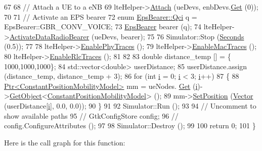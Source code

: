 \begin{DoxyCode}
67 
68   \textcolor{comment}{// Attach a UE to a eNB}
69   lteHelper->\hyperlink{classns3_1_1LteHelper_a9466743f826aa2652a87907b7f0a1c87}{Attach} (ueDevs, enbDevs.\hyperlink{classns3_1_1NetDeviceContainer_a677d62594b5c9d2dea155cc5045f4d0b}{Get} (0));
70 
71   \textcolor{comment}{// Activate an EPS bearer}
72   \textcolor{keyword}{enum} \hyperlink{structns3_1_1EpsBearer_aecf0c67109c5eb4ec0b07226fff5885e}{EpsBearer::Qci} q = EpsBearer::GBR\_CONV\_VOICE;
73   \hyperlink{structns3_1_1EpsBearer}{EpsBearer} bearer (q);
74   lteHelper->\hyperlink{classns3_1_1LteHelper_ac896e16cf162e4beeaa292d39ab1b700}{ActivateDataRadioBearer} (ueDevs, bearer);
75 
76   Simulator::Stop (\hyperlink{group__timecivil_ga33c34b816f8ff6628e33d5c8e9713b9e}{Seconds} (0.5));
77 
78   lteHelper->\hyperlink{classns3_1_1LteHelper_ad6d7edf234d29f7b8363e9ebf73fe32e}{EnablePhyTraces} ();
79   lteHelper->\hyperlink{classns3_1_1LteHelper_affa3a12841520407d3662417fe41863d}{EnableMacTraces} ();
80   lteHelper->\hyperlink{classns3_1_1LteHelper_abadfdd04d30b261e9b6f0846b4784928}{EnableRlcTraces} ();
81 
82 
83   \textcolor{keywordtype}{double} distance\_temp [] = \{ 1000,1000,1000\};
84   std::vector<double> userDistance;
85   userDistance.assign (distance\_temp, distance\_temp + 3);
86   \textcolor{keywordflow}{for} (\textcolor{keywordtype}{int} \hyperlink{bernuolliDistribution_8m_a6f6ccfcf58b31cb6412107d9d5281426}{i} = 0; \hyperlink{bernuolliDistribution_8m_a6f6ccfcf58b31cb6412107d9d5281426}{i} < 3; \hyperlink{bernuolliDistribution_8m_a6f6ccfcf58b31cb6412107d9d5281426}{i}++)
87     \{
88       \hyperlink{classns3_1_1Ptr}{Ptr<ConstantPositionMobilityModel>} mm = ueNodes.
      \hyperlink{classns3_1_1NodeContainer_a9ed96e2ecc22e0f5a3d4842eb9bf90bf}{Get} (\hyperlink{bernuolliDistribution_8m_a6f6ccfcf58b31cb6412107d9d5281426}{i})->\hyperlink{classns3_1_1Object_a13e18c00017096c8381eb651d5bd0783}{GetObject}<\hyperlink{classns3_1_1ConstantPositionMobilityModel}{ConstantPositionMobilityModel}> ();
89       mm->\hyperlink{classns3_1_1MobilityModel_ac584b3d5a309709d2f13ed6ada1e7640}{SetPosition} (\hyperlink{classns3_1_1Vector3D_a7e59b47bc94c9cb1dadff68c1d0112d8}{Vector} (userDistance[\hyperlink{bernuolliDistribution_8m_a6f6ccfcf58b31cb6412107d9d5281426}{i}], 0.0, 0.0));
90     \} 
91 
92   Simulator::Run ();
93 
94   \textcolor{comment}{// Uncomment to show available paths}
95   \textcolor{comment}{// GtkConfigStore config;}
96   \textcolor{comment}{// config.ConfigureAttributes ();}
97 
98   Simulator::Destroy ();
99 
100   \textcolor{keywordflow}{return} 0;
101 \}
\end{DoxyCode}


Here is the call graph for this function\+:


